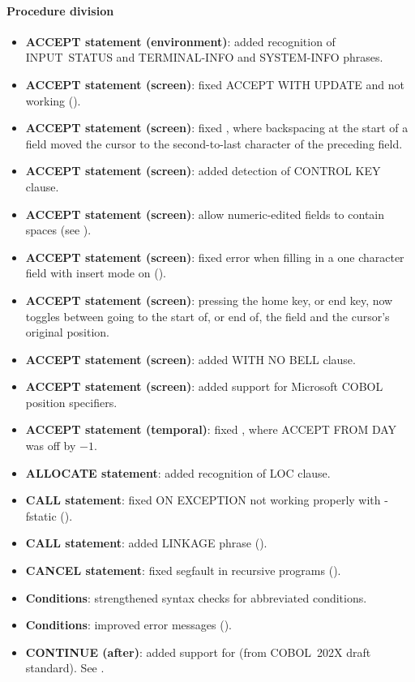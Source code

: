 \paragraph{Procedure division}
\begin{itemize}
\item \textbf{ACCEPT statement (environment)}: added recognition of INPUT~STATUS and TERMINAL-INFO and SYSTEM-INFO phrases. 
\item \textbf{ACCEPT statement (screen)}: fixed ACCEPT WITH UPDATE and not working ().
\item \textbf{ACCEPT statement (screen)}: fixed , where backspacing at the start of a field moved the cursor to the second-to-last character of the preceding field.
\item \textbf{ACCEPT statement (screen)}: added detection of CONTROL KEY clause.
\item \textbf{ACCEPT statement (screen)}: allow numeric-edited fields to contain spaces (see ).
\item \textbf{ACCEPT statement (screen)}: fixed error when filling in a one character field with insert mode on ().
\item \textbf{ACCEPT statement (screen)}: pressing the home key, or end key, now toggles between going to the start of, or end of, the field and the cursor's original position.
\item \textbf{ACCEPT statement (screen)}: added WITH NO BELL clause.
\item \textbf{ACCEPT statement (screen)}: added support for Microsoft COBOL position specifiers.
\item \textbf{ACCEPT statement (temporal)}: fixed , where ACCEPT FROM DAY was off by $-1$.
\item \textbf{ALLOCATE statement}: added recognition of LOC clause.
\item \textbf{CALL statement}: fixed ON EXCEPTION not working properly with -fstatic ().
\item \textbf{CALL statement}: added LINKAGE phrase ().
\item \textbf{CANCEL statement}: fixed segfault in recursive programs ().
\item \textbf{Conditions}: strengthened syntax checks for abbreviated conditions.
\item \textbf{Conditions}: improved error messages ().
\item \textbf{CONTINUE (after)}: added support for (from COBOL~202X draft standard). See .

\end{itemize}
